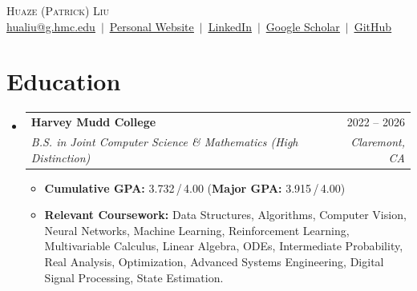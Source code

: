 \documentclass[letterpaper,10pt]{article}
\makeatletter
\newcommand{\resumeItem}[1]{
  \item\small{
    {#1 \vspace{-2pt}}
  }
}
\newcommand{\resumeSubheading}[4]{
  \vspace{-2pt}\item
    \begin{tabular*}{\linewidth}[t]{l@{\extracolsep{\fill}}r}
      \textbf{#1} & #2 \\
      \textit{\small#3} & \textit{\small #4} \\
    \end{tabular*}\vspace{-7pt}
}
\newcommand{\resumeSubHeadingListStart}{\begin{itemize}[leftmargin=0.15in, label={}]}
\newcommand{\resumeSubHeadingListEnd}{\end{itemize}}
\newcommand{\resumeItemListStart}{\begin{itemize}}
\newcommand{\resumeItemListEnd}{\end{itemize}\vspace{-5pt}}
\makeatother
\begin{document}
\begin{center}
    {\Huge \scshape Huaze (Patrick) Liu} \\ \vspace{2pt}
    \small \href{mailto:hualiu@g.hmc.edu}{\underline{hualiu@g.hmc.edu}} $\,\vert\,$
    \href{https://huazeliu.github.io/}{\underline{Personal Website}} $\,\vert\,$
    \href{https://www.linkedin.com/in/huazeliu/}{\underline{LinkedIn}} $\,\vert\,$
    \href{https://scholar.google.com/citations?user=CVNefH4AAAAJ&hl=en}{\underline{Google Scholar}} $\,\vert\,$
    \href{https://github.com/HuazeLiu}{\underline{GitHub}}
\end{center}

\section{Education}
  \resumeSubHeadingListStart
    \resumeSubheading
      {Harvey Mudd College}{2022 -- 2026}
      {B.S. in Joint Computer Science \& Mathematics (High Distinction)}{Claremont, CA}
    \resumeItemListStart
      \resumeItem{\textbf{Cumulative GPA:} 3.732\,/\,4.00 \quad (\textbf{Major GPA:} 3.915\,/\,4.00)}
      \resumeItem{\textbf{Relevant Coursework:} Data Structures, Algorithms, Computer Vision, Neural Networks, Machine Learning, Reinforcement Learning, Multivariable Calculus, Linear Algebra, ODEs, Intermediate Probability, Real Analysis, Optimization, Advanced Systems Engineering, Digital Signal Processing, State Estimation.}
    \resumeItemListEnd
  \resumeSubHeadingListEnd

\end{document}
